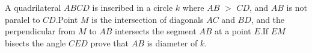 A quadrilateral $ABCD$ is inscribed in a circle $k$ where $AB$ $>$ $CD$, and $AB$ is not paralel to $CD$.Point $M$ is the intersection of diagonals $AC$ and $BD$,  and the perpendicular from $M$ to $AB$ intersects the segment $AB$ at a point $E$.If $EM$ bisects the angle $CED$ prove that $AB$ is diameter of $k$.